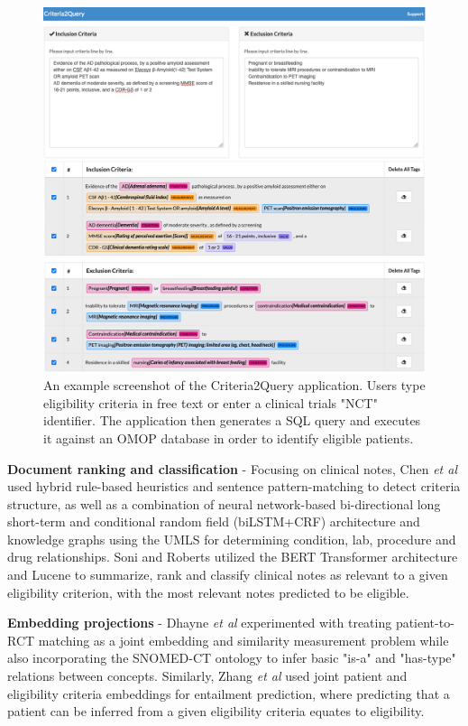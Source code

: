 \documentclass[../main.tex]{subfiles}
\begin{document}
\begin{figure}[!ht]
  \includegraphics[scale=0.77]{Figures/2_background/criteria2query.png}  
\caption{An example screenshot of the Criteria2Query application. Users type eligibility criteria in free text or enter a clinical trials "NCT" identifier. The application then generates a SQL query and executes it against an OMOP database in order to identify eligible patients.}
\label{fig_criteria2query}
\end{figure}

\textbf{Document ranking and classification} - Focusing on clinical notes, Chen \textit{et al} \cite{chen2019clinical} used hybrid rule-based heuristics and sentence pattern-matching to detect criteria structure, as well as a combination of neural network-based bi-directional long short-term and conditional random field (biLSTM+CRF) architecture and knowledge graphs using the UMLS for determining condition, lab, procedure and drug relationships. Soni and Roberts \cite{soni2020patient} utilized the BERT Transformer architecture \cite{devlin2018bert} and Lucene \cite{lucene} to summarize, rank and classify clinical notes as relevant to a given eligibility criterion, with the most relevant notes predicted to be eligible. 

\textbf{Embedding projections} - Dhayne \textit{et al} \cite{dhayne2021emr2vec} experimented with treating patient-to-RCT matching as a joint embedding and similarity measurement problem while also incorporating the SNOMED-CT ontology to infer basic "is-a" and "has-type" relations between concepts. Similarly, Zhang \textit{et al} \cite{zhang2020deepenroll} used joint patient and eligibility criteria embeddings for entailment prediction, where predicting that a patient can be inferred from a given eligibility criteria equates to eligibility. 
\end{document}

